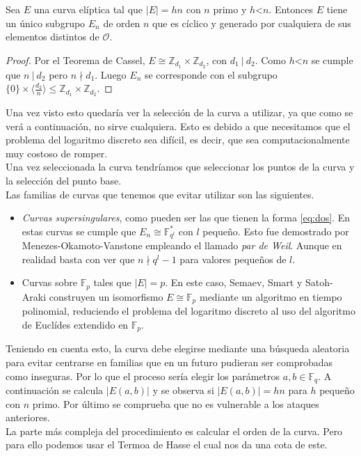 \begin{lema}
		Sea $E$ una curva elíptica tal que $|E|=hn$ con $n$ primo y $h$\textless $n$. Entonces $E$ tiene un único subgrupo $E_n$ de orden $n$ que es cíclico y generado por cualquiera de sus elementos distintos de $\mathcal{O}$.
\end{lema}
\begin{proof}
		Por el Teorema de Cassel, $E\cong \mathbb{Z}_{d_1}\times \mathbb{Z}_{d_2}$, con $d_1\:|\:d_2$. Como $h$\textless$n$ se cumple que $n\:|\:d_2$ pero $n \nmid d_1$. Luego $E_n$ se corresponde con el subgrupo $\{0\}\times \langle \frac{d_2}{n} \rangle\leq\mathbb{Z}_{d_1}\times\mathbb{Z}_{d_2}$.
\end{proof}

Una vez visto esto quedaría ver la selección de la curva a utilizar, ya que como se verá a continuación, no sirve cualquiera. Esto es debido a que necesitamos que el problema del logaritmo discreto sea difícil, es decir, que sea computacionalmente muy costoso de romper.\\
Una vez seleccionada la curva tendríamos que seleccionar los puntos de la curva y la selección del punto base.\\
Las familias de curvas que tenemos que evitar utilizar son las siguientes.
\begin{itemize}
	\item \emph{Curvas supersingulares}, como pueden ser las que tienen la forma \eqref{eq:dos}. En estas curvas se cumple que $E_n\cong \mathbb{F}_{q^l}^*$ con $l$ pequeño. Esto fue demostrado por Menezes-Okamoto-Vanstone empleando el llamado \emph{par de Weil}. Aunque en realidad basta con ver que $n\nmid q^l-1$ para valores pequeños de $l$.
	\item Curvas sobre $\mathbb{F}_p$ tales que $|E|=p$. En este caso, Semaev, Smart y Satoh-Araki construyen un isomorfismo $E\cong\mathbb{F}_p$ mediante un algoritmo en tiempo polinomial, reduciendo el problema del logaritmo discreto al uso del algoritmo de Euclídes extendido en $\mathbb{F}_p$.
\end{itemize}
Teniendo en cuenta esto, la curva debe elegirse mediante una búsqueda aleatoria para evitar centrarse en familias que en un futuro pudieran ser comprobadas como inseguras. Por lo que el proceso sería elegir los parámetros $a,b\in \mathbb{F}_q$. A continuación se calcula $|E(a,b)|$ y se observa si $|E(a,b)|=hn$ para $h$ pequeño con $n$ primo. Por último se comprueba que no es vulnerable a los ataques anteriores.\\
La parte más compleja del procedimiento es calcular el orden de la curva. Pero para ello podemos usar el Termoa de Hasse el cual nos da una cota de este.
